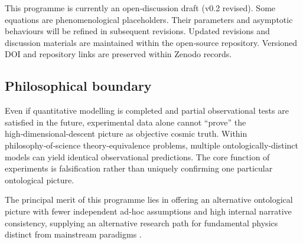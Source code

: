 \documentclass[12pt,a4paper]{article}
\begin{document}
This programme is currently an open‑discussion draft (v0.2 revised). Some equations are phenomenological placeholders. Their parameters and asymptotic behaviours will be refined in subsequent revisions. Updated revisions and discussion materials are maintained within the open‑source repository. Versioned DOI and repository links are preserved within Zenodo records.

\subsection{Philosophical boundary}
Even if quantitative modelling is completed and partial observational tests are satisfied in the future, experimental data alone cannot ``prove'' the high‑dimensional‑descent picture as objective cosmic truth. Within philosophy‑of‑science theory‑equivalence problems, multiple ontologically‑distinct models can yield identical observational predictions. The core function of experiments is falsification rather than uniquely confirming one particular ontological picture.

The principal merit of this programme lies in offering an alternative ontological picture with fewer independent ad‑hoc assumptions and high internal narrative consistency, supplying an alternative research path for fundamental physics distinct from mainstream paradigms \cite{popper1959,kuhn1962}.
\end{document}
